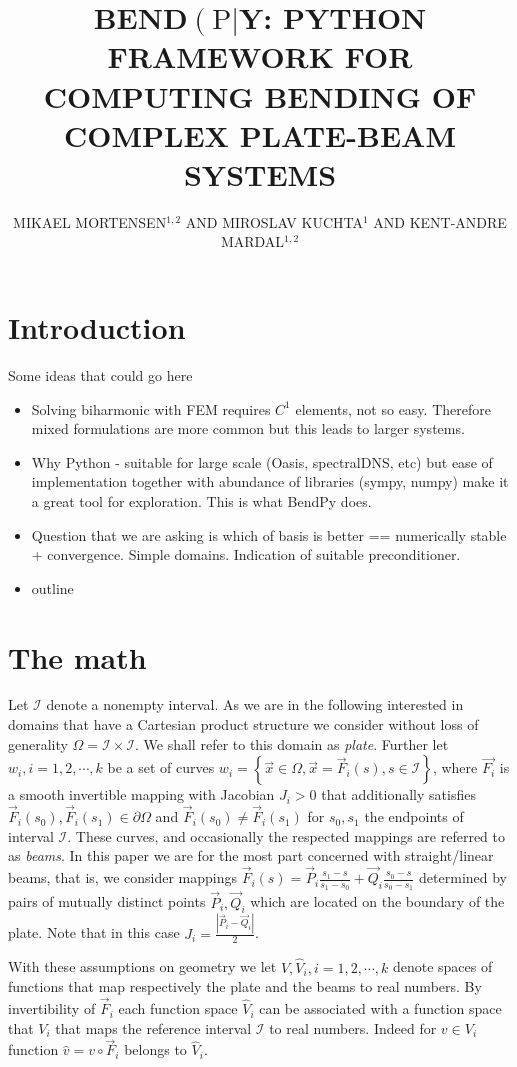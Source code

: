 \documentclass{marine_2015}
\title{
  BEND$\left(\text{P}\right|$Y: PYTHON FRAMEWORK FOR COMPUTING BENDING OF COMPLEX PLATE-BEAM SYSTEMS
}
\author{MIKAEL MORTENSEN$^{1, 2}$ AND MIROSLAV KUCHTA$^{1}$ AND KENT-ANDRE MARDAL$^{1, 2}$ }
\begin{document}
\section{Introduction}
Some ideas that could go here
\begin{itemize}
  \item Solving biharmonic with FEM requires $C^1$ elements, not so easy.
    Therefore mixed formulations are more common but this leads to larger
    systems.
  \item Why Python - suitable for large scale (Oasis, spectralDNS, etc) but ease
    of implementation together with abundance of libraries (sympy, numpy) make
    it a great tool for exploration. This is what BendPy does.
  \item Question that we are asking is which of basis is better == numerically
    stable + convergence. Simple domains. Indication of suitable preconditioner.
  \item outline
\end{itemize}

\section{The math}
Let $\mathcal{I}$ denote a nonempty interval. As we are in the following
interested in domains that have a Cartesian product structure we consider without
loss of generality $\Omega=\mathcal{I}\times\mathcal{I}$. We shall refer to this
domain as \textit{plate}. Further let $w_i, i=1, 2,\cdots, k$ be a set of curves 
$w_i=\left\{\vec{x}\in\Omega, \vec{x}=\vec{F}_i\left(s\right),
s\in\mathcal{I}\right\}$, where $\vec{F_i}$ is a smooth invertible mapping with
Jacobian $J_i>0$ that additionally satisfies $\vec{F}_i\left(s_0\right),
\vec{F}_i\left(s_1\right)\in\partial\Omega$ and
$\vec{F}_i\left(s_0\right) \neq \vec{F}_i\left(s_1\right)$ for $s_0, s_1$ the
endpoints of interval $\mathcal{I}$. These curves, and occasionally the
respected mappings are referred to as \textit{beams}. In this paper we are for the
most part concerned with straight/linear beams, that is, we consider mappings
$\vec{F}_i\left(s\right)=\vec{P}_i\tfrac{s_1-s}{s_1-s_0}+\vec{Q}_i\tfrac{s_0-s}{s_0-s_1}$
determined by pairs of mutually distinct points $\vec{P}_i, \vec{Q}_i$ which
are located on the boundary of the plate. Note that in this case
$J_i=\tfrac{\left|\vec{P}_i-\vec{Q}_i\right|}{2}$.

With these assumptions on geometry we let $V, \hat{V}_i, i=1, 2, \cdots, k$ denote
spaces of functions that map respectively the plate and the beams to real
numbers. By invertibility of $\vec{F}_i$ each function space $\hat{V}_i$ can be
associated with a function space that $V_{i}$ that maps the reference interval
$\mathcal{I}$ to real numbers. Indeed for $v\in V_i$ function
$\hat{v}=v\circ\vec{F}_i$ belongs to $\hat{V}_i$.
\end{document}
